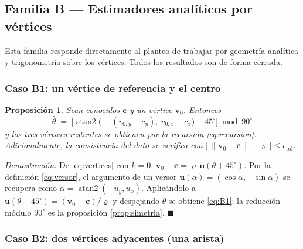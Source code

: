 \documentclass[11pt,a4paper]{article}
\newtheorem{proposicion}[teorema]{Proposición}
\theoremstyle{definition}
\newenvironment{demo}{\par\noindent\textit{Demostración.}\;}{\hfill$\blacksquare$\par\medskip}
\newcommand{\uu}{\mathbf{u}}
\newcommand{\vv}{\mathbf{v}}
\newcommand{\cc}{\mathbf{c}}
\newcommand{\atantwo}{\operatorname{atan2}}
\newcommand{\grados}{^{\circ}}
\begin{document}
\subsection{Familia B --- Estimadores analíticos por vértices}
\label{sec:familiaB}

Esta familia responde directamente al planteo de trabajar por geometría analítica y
trigonometría sobre los vértices. Todos los resultados son de forma cerrada.

\subsubsection{Caso B1: un vértice de referencia y el centro}

\begin{proposicion}
\label{prop:B1}
Sean conocidos $\cc$ y un vértice $\vv_0$. Entonces
\begin{equation}
  \boxed{\ \hat\theta \;=\; \Big[\atantwo\big(-(v_{0,y} - c_y),\ v_{0,x} - c_x\big) - 45\grados\Big] \bmod 90\grados\ }
  \label{eq:B1}
\end{equation}
y los tres vértices restantes se obtienen por la recursión \eqref{eq:recursion}.
Adicionalmente, la consistencia del dato se verifica con
$\big|\,\|\vv_0 - \cc\| - \varrho\,\big| \le \epsilon_{\mathrm{tol}}$.
\end{proposicion}

\begin{demo}
De \eqref{eq:vertices} con $k=0$, $\vv_0 - \cc = \varrho\,\uu(\theta+45\grados)$. Por la
definición \eqref{eq:versor}, el argumento de un versor $\uu(\alpha) = (\cos\alpha,
-\sin\alpha)$ se recupera como $\alpha = \atantwo(-u_y, u_x)$. Aplicándolo a
$\uu(\theta+45\grados) = (\vv_0-\cc)/\varrho$ y despejando $\theta$ se obtiene
\eqref{eq:B1}; la reducción módulo $90\grados$ es la proposición \ref{prop:simetria}.
\end{demo}

\subsubsection{Caso B2: dos vértices adyacentes (una arista)}
\end{document}
